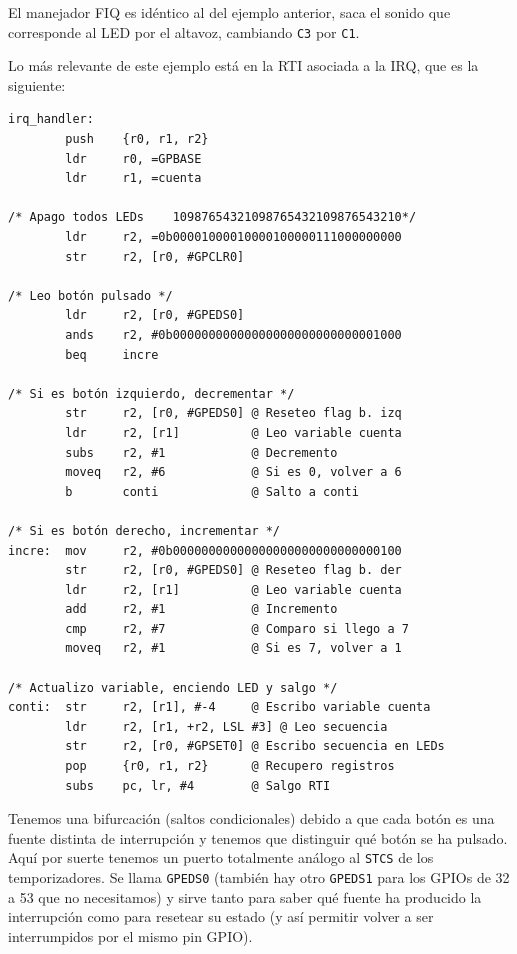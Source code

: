 El manejador FIQ es idéntico al del ejemplo anterior, saca el sonido que corresponde al LED
por el altavoz, cambiando {\tt C3} por {\tt C1}.

Lo más relevante de este ejemplo está en la RTI asociada a la IRQ, que es la siguiente:

\begin{lstlisting}
irq_handler:
        push    {r0, r1, r2}
        ldr     r0, =GPBASE
        ldr     r1, =cuenta

/* Apago todos LEDs    10987654321098765432109876543210*/
        ldr     r2, =0b00001000010000100000111000000000
        str     r2, [r0, #GPCLR0]

/* Leo botón pulsado */
        ldr     r2, [r0, #GPEDS0]
        ands    r2, #0b00000000000000000000000000001000
        beq     incre

/* Si es botón izquierdo, decrementar */
        str     r2, [r0, #GPEDS0] @ Reseteo flag b. izq
        ldr     r2, [r1]          @ Leo variable cuenta
        subs    r2, #1            @ Decremento
        moveq   r2, #6            @ Si es 0, volver a 6
        b       conti             @ Salto a conti

/* Si es botón derecho, incrementar */
incre:  mov     r2, #0b00000000000000000000000000000100
        str     r2, [r0, #GPEDS0] @ Reseteo flag b. der
        ldr     r2, [r1]          @ Leo variable cuenta
        add     r2, #1            @ Incremento
        cmp     r2, #7            @ Comparo si llego a 7
        moveq   r2, #1            @ Si es 7, volver a 1

/* Actualizo variable, enciendo LED y salgo */
conti:  str     r2, [r1], #-4     @ Escribo variable cuenta
        ldr     r2, [r1, +r2, LSL #3] @ Leo secuencia
        str     r2, [r0, #GPSET0] @ Escribo secuencia en LEDs
        pop     {r0, r1, r2}      @ Recupero registros
        subs    pc, lr, #4        @ Salgo RTI
\end{lstlisting}

Tenemos una bifurcación (saltos condicionales) debido a que cada botón es una fuente distinta
de interrupción y tenemos que distinguir qué botón se ha pulsado. Aquí por suerte tenemos
un puerto totalmente análogo al {\tt STCS} de los temporizadores. Se llama {\tt GPEDS0}
(también hay otro {\tt GPEDS1} para los GPIOs de 32 a 53 que no necesitamos) y sirve tanto
para saber qué fuente ha producido la interrupción como para resetear su estado (y así permitir
volver a ser interrumpidos por el mismo pin GPIO).

